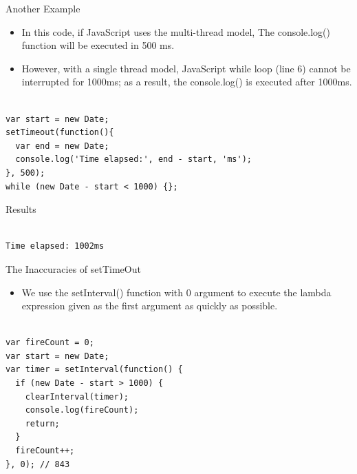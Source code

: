 \begin{frame}[fragile]{Another Example}

\begin{itemize}
	\item In this code, if JavaScript uses the multi-thread model, The console.log() function will be executed in 500 ms.
	\item However, with a single thread model, JavaScript while loop (line 6) cannot be interrupted for 1000ms; as a result, the console.log() is executed after 1000ms. 
\end{itemize}

\begin{Code}{}%
\begin{lstlisting}[firstnumber=1, label=glabels, xleftmargin=0pt, basicstyle=\tiny]% 

var start = new Date;
setTimeout(function(){
  var end = new Date;
  console.log('Time elapsed:', end - start, 'ms');
}, 500);
while (new Date - start < 1000) {};
\end{lstlisting}%
\end{Code}%
\begin{Command}{Results}%
\begin{lstlisting}[firstnumber=1, label=glabels, xleftmargin=0pt, basicstyle=\tiny]% 

Time elapsed: 1002ms
\end{lstlisting}%
\end{Command}%

\end{frame}

\begin{frame}[fragile]{The Inaccuracies of setTimeOut}

\begin{itemize}
	\item We use the setInterval() function with 0 argument to execute the lambda expression given as the first argument as quickly as possible. 
\end{itemize}

\begin{Code}{}%
\begin{lstlisting}[firstnumber=1, label=glabels, xleftmargin=0pt, basicstyle=\scriptsize]% 

var fireCount = 0;
var start = new Date;
var timer = setInterval(function() {
  if (new Date - start > 1000) {
    clearInterval(timer);
    console.log(fireCount);
    return;
  }
  fireCount++;
}, 0); // 843
\end{lstlisting}%
\end{Code}%
\end{frame}

